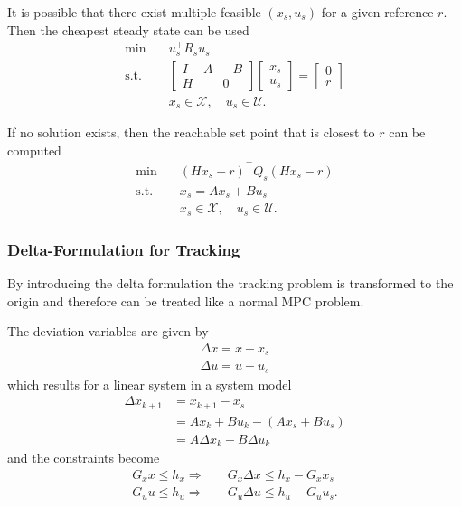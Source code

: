 \newpar{}

It is possible that there exist multiple feasible $(x_s, u_s)$ for a given reference $r$. Then the cheapest steady state can be used
\begin{align*}
    \min\quad    & u_s^\top R_s u_s                                \\
    \text{s.t. } & \begin{bmatrix}
                       I-A & -B \\
                       H   & 0
                   \end{bmatrix}
    \begin{bmatrix}
        x_s \\
        u_s
    \end{bmatrix}
    = \begin{bmatrix}
          0 \\
          r
      \end{bmatrix}                                               \\
                 & x_s \in \mathcal{X}, \quad u_s \in \mathcal{U}.
\end{align*}

If no solution exists, then the reachable set point that is closest to $r$ can be computed
\begin{align*}
    \min\quad    & {\left(Hx_s -r\right)}^\top Q_s \left(Hx_s -r\right) \\
    \text{s.t. } & x_s = Ax_s + Bu_s                                    \\
                 & x_s \in \mathcal{X}, \quad u_s \in \mathcal{U}.
\end{align*}

\subsubsection{Delta-Formulation for Tracking}

By introducing the delta formulation the tracking problem is transformed to the origin and therefore can be treated like a normal MPC problem.

\newpar{}

The deviation variables are given by
\begin{gather*}
    \Delta x = x - x_s \\
    \Delta u = u - u_s
\end{gather*}
which results for a linear system in a system model
\begin{align*}
    \Delta x_{k+1} & = x_{k+1}-x_s                \\
                   & = Ax_k + Bu_k -(Ax_s + Bu_s) \\
                   & = A\Delta x_k + B\Delta u_k
\end{align*}
and the constraints become
\begin{align*}
    G_x x \leq h_x \Rightarrow & \quad G_x\Delta x \leq h_x - G_x x_s  \\
    G_u u \leq h_u \Rightarrow & \quad G_u\Delta u \leq h_u - G_u u_s.
\end{align*}


